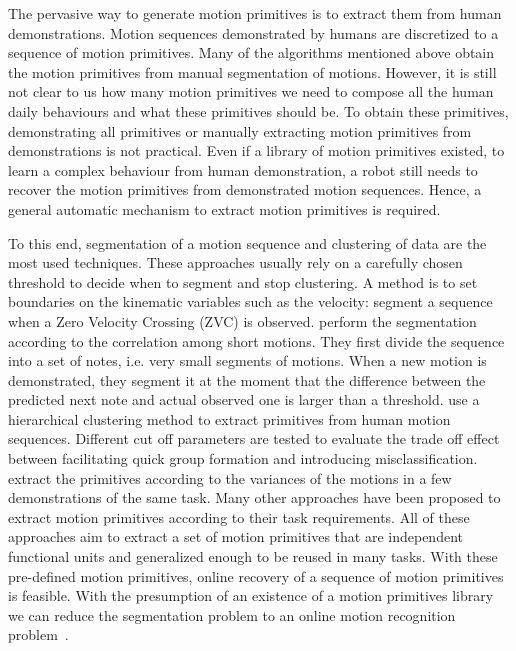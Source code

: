 The pervasive way to generate motion primitives is to extract them from human demonstrations. Motion sequences demonstrated by humans are discretized to a sequence of motion primitives.
Many of the algorithms mentioned above obtain the motion primitives from manual segmentation of motions. However, it is still not clear to us how many motion primitives we need to compose all the human daily behaviours and what these primitives should be. To obtain these primitives, demonstrating all primitives or manually extracting motion primitives from demonstrations is not practical. Even if a library of motion primitives existed, to learn a complex behaviour from human demonstration, a robot still needs to recover the motion primitives from demonstrated motion sequences. Hence, a general automatic mechanism to extract motion primitives is required.

To this end, segmentation of a motion sequence \citep{takano2006humanoid,Pais2013ID879} and clustering of data \citep{kulic2009online,kulic2012incremental} are the most used techniques. These approaches usually rely on a carefully chosen threshold to decide when to segment and stop clustering. A method is to set boundaries on the kinematic variables such as the velocity: \citet{fod2002automated} segment a sequence when a Zero Velocity Crossing (ZVC) is observed. \citet{takano2006humanoid} perform the segmentation according to the correlation among short motions. They first divide the sequence into a set of notes, i.e. very small segments of motions. When a new motion is demonstrated, they segment it at the moment that the difference between the predicted next note and actual observed one is larger than a threshold. \citet{kulic2008incremental} use a hierarchical clustering method to extract primitives from human motion sequences. Different cut off parameters are tested to evaluate the trade off effect between facilitating quick group formation and introducing misclassification. \citet{Pais2013ID879} extract the primitives according to the variances of the motions in a few demonstrations of the same task. Many other approaches have been proposed to extract motion primitives according to their task requirements. All of these approaches aim to extract a set of motion primitives that are independent functional units and generalized enough to be reused in many tasks. With these pre-defined motion primitives, online recovery of a sequence of motion primitives is feasible. With the presumption of an existence of a motion primitives library we can reduce the segmentation problem to an online motion recognition problem~\citep{meier2011movement}.

